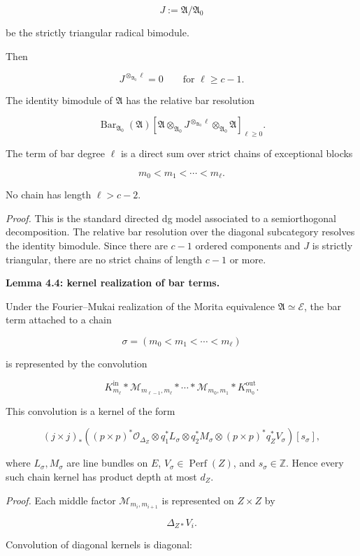 \documentclass[11pt]{amsart}
\theoremstyle{definition}
\begin{document}
\[
J:=\mathfrak A/\mathfrak A_0
\]

be the strictly triangular radical bimodule.

Then

\[
J^{\otimes_{\mathfrak A_0}\ell}=0
\qquad
\text{for }\ell\ge c-1.
\]

The identity bimodule of $\mathfrak A$ has the relative bar resolution

\[
\operatorname{Bar}_{\mathfrak A_0}(\mathfrak A)
\left[
\mathfrak A
\otimes_{\mathfrak A_0}
J^{\otimes_{\mathfrak A_0}\ell}
\otimes_{\mathfrak A_0}
\mathfrak A
\right]_{\ell\ge0}.
\]

The term of bar degree $\ell$ is a direct sum over strict chains of exceptional blocks

\[
m_0<m_1<\cdots<m_\ell.
\]

No chain has length $\ell>c-2$.

\noindent\emph{Proof.} This is the standard directed dg model associated to a semiorthogonal decomposition. The relative bar resolution over the diagonal subcategory resolves the identity bimodule. Since there are $c-1$ ordered components and $J$ is strictly triangular, there are no strict chains of length $c-1$ or more.

\noindent\textbf{Lemma 4.4: kernel realization of bar terms.}

Under the Fourier--Mukai realization of the Morita equivalence $\mathfrak A\simeq\mathcal E$, the bar term attached to a chain

\[
\sigma=(m_0<m_1<\cdots<m_\ell)
\]

is represented by the convolution

\[
K_{m_\ell}^{\mathrm{in}}
*
\mathcal M_{m_{\ell-1},m_\ell}
*
\cdots
*
\mathcal M_{m_0,m_1}
*
K_{m_0}^{\mathrm{out}}.
\]

This convolution is a kernel of the form

\[
(j\times j)_*
\left(
(p\times p)^*\mathcal O_{\Delta_Z}
\otimes q_1^*L_\sigma
\otimes q_2^*M_\sigma
\otimes (p\times p)^*q_Z^*V_\sigma
\right)[s_\sigma],
\tag{4.3}
\]

where $L_\sigma,M_\sigma$ are line bundles on $E$, $V_\sigma\in\operatorname{Perf}(Z)$, and $s_\sigma\in\mathbb Z$. Hence every such chain kernel has product depth at most $d_Z$.

\noindent\emph{Proof.} Each middle factor $\mathcal M_{m_i,m_{i+1}}$ is represented on $Z\times Z$ by

\[
\Delta_{Z*}V_i.
\]

Convolution of diagonal kernels is diagonal:
\end{document}
